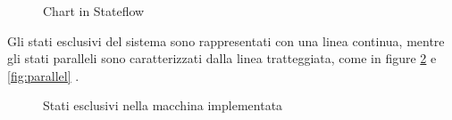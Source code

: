\documentclass{article}
\begin{document}
                \begin{figure} [ht]
                    \caption{Chart in Stateflow}
                    \label{fig:chart}
                \end{figure} 
                    
                Gli stati esclusivi del sistema sono rappresentati con una linea continua, mentre gli stati paralleli sono caratterizzati dalla linea tratteggiata, come in
                figure \ref{fig:escl} e \ref{fig:parallel} . 

                \begin{figure} [ht]
                    \caption{Stati esclusivi nella macchina implementata}
                    \label{fig:escl}
                \end{figure} 
                    
\end{document}
